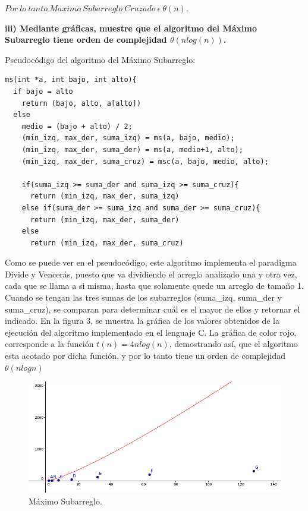 \documentclass[12pt]{report}
\begin{document}
	$Por \ lo \ tanto \ Maximo \ Subarreglo \ Cruzado \  \epsilon \ \theta (n).$\\
	\newpage
	
	\textbf{iii) Mediante gráficas, muestre que el algoritmo del Máximo Subarreglo tiene orden de complejidad $\theta (n log(n))$.}\newline
	
Pseudocódigo del algoritmo del Máximo Subarreglo:
\lstset{language=C, breaklines=true, basicstyle=\footnotesize}
\lstset{numbers=left, numberstyle=\tiny, stepnumber=1, numbersep=10pt}
\begin{lstlisting}
ms(int *a, int bajo, int alto){
  if bajo = alto		
    return (bajo, alto, a[alto]) 
  else							
    medio = (bajo + alto) / 2;		
    (min_izq, max_der, suma_izq) = ms(a, bajo, medio);			
    (min_izq, max_der, suma_der) = ms(a, medio+1, alto);		
    (min_izq, max_der, suma_cruz) = msc(a, bajo, medio, alto);	
  
    if(suma_izq >= suma_der and suma_izq >= suma_cruz){
      return (min_izq, max_der, suma_izq)
    else if(suma_der >= suma_izq and suma_der >= suma_cruz){
      return (min_izq, max_der, suma_der)
    else 
      return (min_izq, max_der, suma_cruz)

\end{lstlisting}
	
	Como se puede ver en el pseudocódigo, este algoritmo implementa el paradigma Divide y Vencerás, puesto que va dividiendo el arreglo analizado una y otra vez, cada que se llama a si misma, hasta que solamente quede un arreglo de tamaño 1. Cuando se tengan las tres sumas de los subarreglos (suma\_izq, suma\_der y suma\_cruz), se comparan para determinar cuál es el mayor de ellos y retornar el indicado.\newline
	En la figura 3, se muestra la gráfica de los valores obtenidos de la ejecución del algoritmo implementado en el lenguaje C. La gráfica de color rojo, corresponde a la función $t(n) = 4 nlog(n)$, demostrando así, que el algoritmo esta acotado por dicha función, y por lo tanto tiene un orden de complejidad $\theta (n log n)$
	
	\begin{figure}[H]
		\includegraphics[width=12cm]{imagenes/3.png}
		\centering
		\caption{Máximo Subarreglo.}
		\centering
	\end{figure}
	
\end{document}
